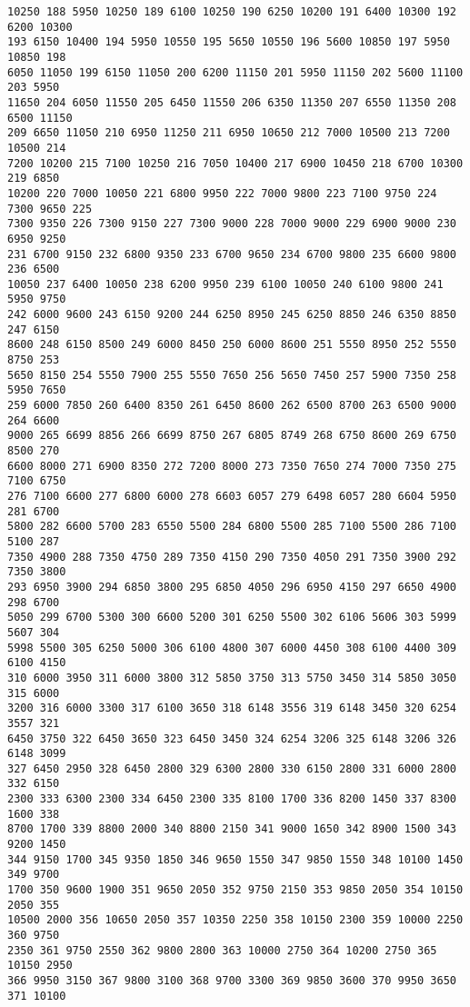 \documentclass[11pt]{article}
\begin{document}
\begin{Verbatim}[commandchars=\\\{\}]
10250 188 5950 10250 189 6100 10250 190 6250 10200 191 6400 10300 192 6200 10300
193 6150 10400 194 5950 10550 195 5650 10550 196 5600 10850 197 5950 10850 198
6050 11050 199 6150 11050 200 6200 11150 201 5950 11150 202 5600 11100 203 5950
11650 204 6050 11550 205 6450 11550 206 6350 11350 207 6550 11350 208 6500 11150
209 6650 11050 210 6950 11250 211 6950 10650 212 7000 10500 213 7200 10500 214
7200 10200 215 7100 10250 216 7050 10400 217 6900 10450 218 6700 10300 219 6850
10200 220 7000 10050 221 6800 9950 222 7000 9800 223 7100 9750 224 7300 9650 225
7300 9350 226 7300 9150 227 7300 9000 228 7000 9000 229 6900 9000 230 6950 9250
231 6700 9150 232 6800 9350 233 6700 9650 234 6700 9800 235 6600 9800 236 6500
10050 237 6400 10050 238 6200 9950 239 6100 10050 240 6100 9800 241 5950 9750
242 6000 9600 243 6150 9200 244 6250 8950 245 6250 8850 246 6350 8850 247 6150
8600 248 6150 8500 249 6000 8450 250 6000 8600 251 5550 8950 252 5550 8750 253
5650 8150 254 5550 7900 255 5550 7650 256 5650 7450 257 5900 7350 258 5950 7650
259 6000 7850 260 6400 8350 261 6450 8600 262 6500 8700 263 6500 9000 264 6600
9000 265 6699 8856 266 6699 8750 267 6805 8749 268 6750 8600 269 6750 8500 270
6600 8000 271 6900 8350 272 7200 8000 273 7350 7650 274 7000 7350 275 7100 6750
276 7100 6600 277 6800 6000 278 6603 6057 279 6498 6057 280 6604 5950 281 6700
5800 282 6600 5700 283 6550 5500 284 6800 5500 285 7100 5500 286 7100 5100 287
7350 4900 288 7350 4750 289 7350 4150 290 7350 4050 291 7350 3900 292 7350 3800
293 6950 3900 294 6850 3800 295 6850 4050 296 6950 4150 297 6650 4900 298 6700
5050 299 6700 5300 300 6600 5200 301 6250 5500 302 6106 5606 303 5999 5607 304
5998 5500 305 6250 5000 306 6100 4800 307 6000 4450 308 6100 4400 309 6100 4150
310 6000 3950 311 6000 3800 312 5850 3750 313 5750 3450 314 5850 3050 315 6000
3200 316 6000 3300 317 6100 3650 318 6148 3556 319 6148 3450 320 6254 3557 321
6450 3750 322 6450 3650 323 6450 3450 324 6254 3206 325 6148 3206 326 6148 3099
327 6450 2950 328 6450 2800 329 6300 2800 330 6150 2800 331 6000 2800 332 6150
2300 333 6300 2300 334 6450 2300 335 8100 1700 336 8200 1450 337 8300 1600 338
8700 1700 339 8800 2000 340 8800 2150 341 9000 1650 342 8900 1500 343 9200 1450
344 9150 1700 345 9350 1850 346 9650 1550 347 9850 1550 348 10100 1450 349 9700
1700 350 9600 1900 351 9650 2050 352 9750 2150 353 9850 2050 354 10150 2050 355
10500 2000 356 10650 2050 357 10350 2250 358 10150 2300 359 10000 2250 360 9750
2350 361 9750 2550 362 9800 2800 363 10000 2750 364 10200 2750 365 10150 2950
366 9950 3150 367 9800 3100 368 9700 3300 369 9850 3600 370 9950 3650 371 10100

\end{Verbatim}
\end{document}
